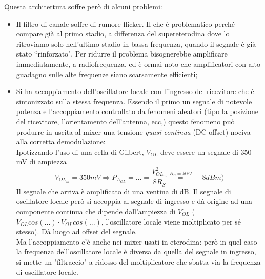 Questa architettura soffre però di alcuni problemi:
\begin{itemize}
	\item Il filtro di canale soffre di rumore flicker. Il che è problematico perché compare già al primo stadio, a differenza del supereterodina dove lo ritroviamo solo nell'ultimo stadio in bassa frequenza, quando il segnale è già stato ``rinforzato". Per ridurre il problema bisognerebbe amplificare immediatamente, a radiofrequenza, ed è ormai noto che amplificatori con alto guadagno sulle alte frequenze siano scarsamente efficienti;
	\item 
	Si ha accoppiamento dell'oscillatore locale con l'ingresso del ricevitore che è sintonizzato sulla stessa frequenza. Essendo il primo un segnale di notevole potenza e l'accoppiamento controllato da fenomeni aleatori (tipo la posizione del ricevitore, l'orientamento dell'antenna, ecc,) questo fenomeno può produrre in uscita al mixer una tensione \textit{quasi continua} (DC offset) nociva alla corretta demodulazione:
	\\
	Ipotizzando l'uso di una cella di Gilbert, $V_{OL}$ deve essere un segnale di 350 mV di ampiezza
	\[
	V_{OL_m} = 350mV \Rightarrow P_{A_{OL}} = ...= \frac{V_{OL_m}^2}{8R_S} \overset{R_S = 50 \Omega}{=} -8dBm)
	\]
	Il segnale che arriva è amplificato di una ventina di dB. Il segnale di oscillatore locale però si accoppia al segnale di ingresso e dà origine ad una componente continua che dipende dall'ampiezza di $V_{OL}$ ($V_{OL} cos (...) \cdot V_{OL} cos (...)$, l'oscillatore locale viene moltiplicato per sé stesso). Dà luogo ad offset del segnale.\\
	Ma l'accoppiamento c'è anche nei mixer usati in eterodina: però in quel caso la frequenza dell'oscillatore locale è diversa da quella del segnale in ingresso, si mette un "filtraccio" a ridosso del moltiplicatore che sbatta via la frequenza di oscillatore locale.
\end{itemize}





